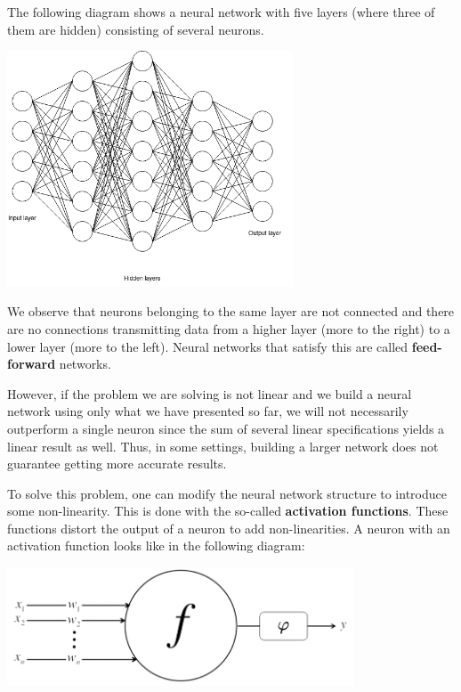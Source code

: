 \documentclass[11pt]{article}
\theoremstyle{definition}
\begin{document}
The following diagram shows a neural network with five layers (where three of them are hidden) consisting of several neurons. 

\begin{center}
    \centering
    \includegraphics[width=\textwidth, height=7cm, keepaspectratio=true]{images/neural_network.png}
    \label{fig:neural_network}
\end{center}

We observe that neurons belonging to the same layer are not connected and there are no connections transmitting data from a higher layer (more to the right) to a lower layer (more to the left). Neural networks that satisfy this are called \textbf{feed-forward} networks.

However, if the problem we are solving is not linear and we build a neural network using only what we have presented so far, we will not necessarily outperform a single neuron since the sum of several linear specifications yields a linear result as well. Thus, in some settings, building a larger network does not guarantee getting more accurate results.

To solve this problem, one can modify the neural network structure to introduce some non-linearity. This is done with the so-called \textbf{activation functions}. These functions distort the output of a neuron to add non-linearities. A neuron with an activation function looks like in the following diagram:

\begin{center}
    \centering
    \includegraphics[width=\textwidth, height=3.5cm, keepaspectratio=true]{images/activation_function.png}
    \label{fig:activation_function}
\end{center}
\end{document}
